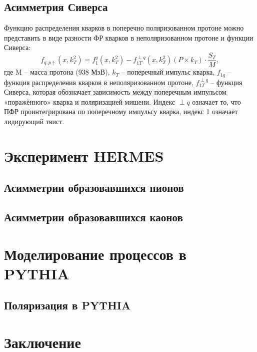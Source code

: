 \documentclass{extarticle}
\begin{document}
\subsection{Асимметрия Сиверса}
Функцию распределения кварков в поперечно поляризованном протоне можно представить в виде разности ФР кварков в неполяризованном протоне и функции Сиверса:
\begin{equation}
	f_{q,p\uparrow} (x,k^2_T )=f_1^q (x,k^2_T )-f_{1T}^{\perp q} (x,k^2_T )(P\times k_T ) \cdot \frac{S_T}{M},
\end{equation}
где M – масса протона (938 МэВ), $k_T$ – поперечный импульс кварка, $f_{1q}$ – функция распределения кварков в неполяризованном протоне, $f_{1T}^{\perp q}$ – функция Сиверса, которая обозначает зависимость между поперечным импульсом «поражённого» кварка и поляризацией мишени. Индекс $\perp q$ означает то, что ПФР проинтегрирована по поперечному импульсу кварка, индекс 1 означает лидирующий твист.
\newpage
\section{Эксперимент HERMES}
\subsection{Асимметрии образовавшихся пионов}
\subsection{Асимметрии образовавшихся каонов}
\newpage 
\section{Моделирование процессов в PYTHIA}
\subsection{Поляризация в PYTHIA}
\newpage
\section{Заключение}

\printbibliography
\end{document}
